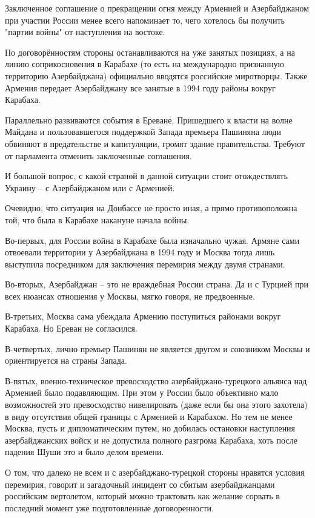 Заключенное соглашение о прекращении огня между Арменией и Азербайджаном при
участии России менее всего напоминает то, чего хотелось бы получить "партии
войны" от наступления на востоке.

По договорённостям стороны останавливаются на уже занятых позициях, а на линию
соприкосновения в Карабахе (то есть на международно признанную территорию
Азербайджана) официально вводятся российские миротворцы. Также Армения передает
Азербайджану все занятые в 1994 году районы вокруг Карабаха.

Параллельно развиваются события в Ереване. Пришедшего к власти на волне Майдана
и пользовавшегося поддержкой Запада премьера Пашиняна люди обвиняют в
предательстве и капитуляции, громят здание правительства. Требуют от парламента
отменить заключенные соглашения.

И большой вопрос, с какой страной в данной ситуации стоит отождествлять Украину
– с Азербайджаном или с Арменией.

Очевидно, что ситуация на Донбассе не просто иная, а прямо противоположна той,
что была в Карабахе накануне начала войны.

Во-первых, для России война в Карабахе была изначально чужая. Армяне сами
отвоевали территории у Азербайджана в 1994 году и Москва тогда лишь выступила
посредником для заключения перемирия между двумя странами.

Во-вторых, Азербайджан – это не враждебная России страна. Да и с Турцией при
всех нюансах отношения у Москвы, мягко говоря, не предвоенные.

В-третьих, Москва сама убеждала Армению поступиться районами вокруг Карабаха.
Но Ереван не согласился.

В-четвертых, лично премьер Пашинян не является другом и союзником Москвы и
ориентируется на страны Запада.

В-пятых, военно-техническое превосходство азербайджано-турецкого альянса над
Арменией было подавляющим. При этом у России было объективно мало возможностей
это превосходство нивелировать (даже если бы она этого захотела) в виду
отсутствия общей границы с Арменией и Карабахом. Но тем не менее Москва, пусть
и дипломатическим путем, но добилась остановки наступления азербайджанских
войск и не допустила полного разгрома Карабаха, хоть после падения Шуши это и
было делом времени.

О том, что далеко не всем и с азербайджано-турецкой стороны нравятся условия
перемирия, говорит и загадочный инцидент со сбитым азербайджанцами российским
вертолетом, который можно трактовать как желание сорвать в последний момент уже
подготовленные договоренности.

